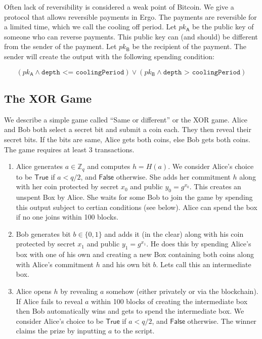 \documentclass[11pt]{article}
\newcommand{\authnote}[2]{\marginpar{\parbox{\marginparwidth}{\tiny %
  \textsf{#1 {\textcolor{blue}{notes: #2}}}}}%
  \textcolor{blue}{\textbf{\dag}}}
\newcommand{\authnote}[2]{
  \textsf{#1 \textcolor{blue}{: #2}}}
\newcommand{\authnote}[2]{}
\newcommand{\snote}[1]{{\authnote{\textcolor{yellow}{Scalahub notes}}{#1}}}
\begin{document}
Often lack of reversibility is considered a weak point of Bitcoin. We give a protocol that allows reversible payments in Ergo. The payments are reversible for a limited time, which we call the cooling off period. Let $pk_\textsf{A}$ be the public key of someone who can reverse payments. This public key can (and should) be different from the sender of the payment. Let $pk_{\textsf{B}}$ be the recipient of the payment. The sender will create the output with the following spending condition:

 $$(pk_\textsf{A}\land \texttt{depth <= coolingPeriod}) \lor (pk_\textsf{B}\land \texttt{depth > coolingPeriod})$$
 
 \snote{This requires a `depth' instruction, which is current not present. Depth is simply current height - inclusion height.}
\subsection{The XOR Game}

We describe a simple game called ``Same or different'' or the XOR game. Alice and Bob both select a secret bit and submit a coin each. They then reveal their secret bits. If the bits are same, Alice gets both coins, else Bob gets both coins. The game requires at least 3 transactions. 
\begin{enumerate}
	\item Alice generates $a\in \mathbb{Z}_q$ and computes $h = H(a)$. We consider Alice's choice to be $\textsf{True}$ if $a < q/2$, and $\textsf{False}$ otherwise. She adds her commitment $h$ along with her coin protected by secret $x_0$ and public $y_0 = g^{x_0}$. This creates an unspent Box by Alice. She waits for some Bob to join the game by spending this output subject to certian conditions (see below). Alice can spend the box if no one joins within 100 blocks. 
	\item Bob generates bit $b\in \{0,1\}$ and adds it (in the clear) along with his coin protected by secret $x_1$ and public $y_1 = g^{x_1}$. He does this by spending Alice's box with one of his own and creating a new Box containing both coins along with Alice's commitment $h$ and his own bit $b$. Lets call this an intermediate box. 
	\item Alice opens $h$ by revealing $a$ somehow (either privately or via the blockchain). If Alice fails to reveal $a$ within 100 blocks of creating the intermediate box then Bob automatically wins and gets to spend the intermediate box. We consider Alice's choice to be $\textsf{True}$ if $a < q/2$, and $\textsf{False}$ otherwise. The winner claims the prize by inputting $a$ to the script. 
\end{enumerate}
\end{document}

